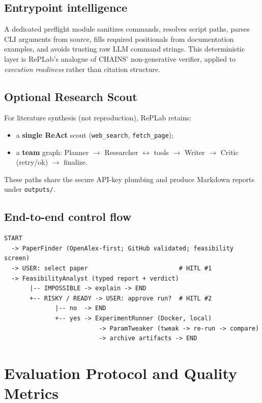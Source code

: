 \documentclass[11pt,a4paper]{article}
\begin{document}
\subsection{Entrypoint intelligence}
A dedicated preflight module sanitizes commands, resolves script paths, parses
CLI arguments from source, fills required positionals from documentation
examples, and avoids trusting raw LLM command strings. This deterministic layer
is RePLab's analogue of CHAINS' non-generative verifier, applied to
\emph{execution readiness} rather than citation structure.

\subsection{Optional Research Scout}
For literature synthesis (not reproduction), RePLab retains:
\begin{itemize}[leftmargin=*,itemsep=2pt]
  \item a \textbf{single ReAct} scout (\texttt{web\_search}, \texttt{fetch\_page});
  \item a \textbf{team} graph: Planner $\rightarrow$ Researcher $\leftrightarrow$
        tools $\rightarrow$ Writer $\rightarrow$ Critic (retry/ok) $\rightarrow$
        finalize.
\end{itemize}
These paths share the secure API-key plumbing and produce Markdown reports under
\texttt{outputs/}.

\subsection{End-to-end control flow}
\begin{verbatim}
START
  -> PaperFinder (OpenAlex-first; GitHub validated; feasibility screen)
  -> USER: select paper                         # HITL #1
  -> FeasibilityAnalyst (typed report + verdict)
       |-- IMPOSSIBLE -> explain -> END
       +-- RISKY / READY -> USER: approve run?  # HITL #2
              |-- no  -> END
              +-- yes -> ExperimentRunner (Docker, local)
                          -> ParamTweaker (tweak -> re-run -> compare)
                          -> archive artifacts -> END
\end{verbatim}

\section{Evaluation Protocol and Quality Metrics}
\label{sec:metrics}
\end{document}
